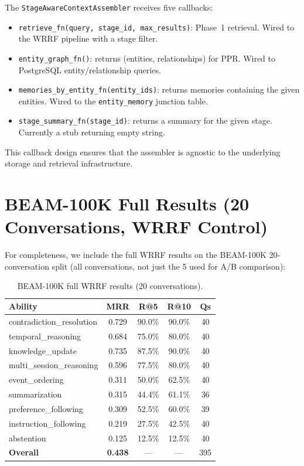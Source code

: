 \documentclass[11pt]{article}
\begin{document}
The \texttt{StageAwareContextAssembler} receives five callbacks:

\begin{itemize}
  \item \texttt{retrieve\_fn(query, stage\_id, max\_results)}: Phase~1
    retrieval.  Wired to the WRRF pipeline with a stage filter.
  \item \texttt{entity\_graph\_fn()}: returns (entities,
    relationships) for PPR.  Wired to PostgreSQL entity/relationship
    queries.
  \item \texttt{memories\_by\_entity\_fn(entity\_ids)}: returns
    memories containing the given entities.  Wired to the
    \texttt{entity\_memory} junction table.
  \item \texttt{stage\_summary\_fn(stage\_id)}: returns a summary for
    the given stage.  Currently a stub returning empty string.
\end{itemize}

This callback design ensures that the assembler is agnostic to the
underlying storage and retrieval infrastructure.

\section{BEAM-100K Full Results (20 Conversations, WRRF Control)}
\label{app:100k-full}

For completeness, we include the full WRRF results on the BEAM-100K
20-conversation split (all conversations, not just the 5 used for
A/B comparison):

\begin{table}[h]
\centering
\caption{BEAM-100K full WRRF results (20 conversations).}
\label{tab:100k-full}
\begin{tabular}{lcccc}
\toprule
Ability & MRR & R@5 & R@10 & Qs \\
\midrule
contradiction\_resolution & 0.729 & 90.0\% & 90.0\% & 40 \\
temporal\_reasoning & 0.684 & 75.0\% & 80.0\% & 40 \\
knowledge\_update & 0.735 & 87.5\% & 90.0\% & 40 \\
multi\_session\_reasoning & 0.596 & 77.5\% & 80.0\% & 40 \\
event\_ordering & 0.311 & 50.0\% & 62.5\% & 40 \\
summarization & 0.315 & 44.4\% & 61.1\% & 36 \\
preference\_following & 0.309 & 52.5\% & 60.0\% & 39 \\
instruction\_following & 0.219 & 27.5\% & 42.5\% & 40 \\
abstention & 0.125 & 12.5\% & 12.5\% & 40 \\
\midrule
\textbf{Overall} & \textbf{0.438} & --- & --- & 395 \\
\bottomrule
\end{tabular}
\end{table}
\end{document}
